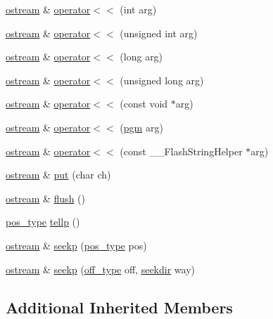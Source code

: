 \begin{DoxyCompactItemize}
\item 
\hyperlink{classostream}{ostream} \& \hyperlink{classostream_a62488f7ce7822c777ea27d15223b8e5f}{operator$<$$<$} (int arg)
\item 
\hyperlink{classostream}{ostream} \& \hyperlink{classostream_ad31df6cd88c7248c01808e40889a7907}{operator$<$$<$} (unsigned int arg)
\item 
\hyperlink{classostream}{ostream} \& \hyperlink{classostream_a15db9977ed82e503bd3cd1f585acf9e6}{operator$<$$<$} (long arg)
\item 
\hyperlink{classostream}{ostream} \& \hyperlink{classostream_aaedd44fefa48cf3f0967fcd699a2909d}{operator$<$$<$} (unsigned long arg)
\item 
\hyperlink{classostream}{ostream} \& \hyperlink{classostream_a2a8febd7c07f078120dd69bb71f25a94}{operator$<$$<$} (const void $\ast$arg)
\item 
\hyperlink{classostream}{ostream} \& \hyperlink{classostream_aac12b0ae1c8fde7a74278536d41d00f0}{operator$<$$<$} (\hyperlink{structpgm}{pgm} arg)
\item 
\hyperlink{classostream}{ostream} \& \hyperlink{classostream_a99ee8d9265d9354f197d02a3d17116be}{operator$<$$<$} (const \+\_\+\+\_\+\+Flash\+String\+Helper $\ast$arg)
\item 
\hyperlink{classostream}{ostream} \& \hyperlink{classostream_a11aad8a1efd284ccfa91cbfb78d089bd}{put} (char ch)
\item 
\hyperlink{classostream}{ostream} \& \hyperlink{classostream_af6be1f30d824f5a65d27d5b5d20b8c6c}{flush} ()
\item 
\hyperlink{classios__base_abe85cf1f181b8bce8022f05ab76aae7f}{pos\+\_\+type} \hyperlink{classostream_a92dec0e2bc8352df1419d1cdc434e619}{tellp} ()
\item 
\hyperlink{classostream}{ostream} \& \hyperlink{classostream_a18b453d2770a8852c312cbda919c4687}{seekp} (\hyperlink{classios__base_abe85cf1f181b8bce8022f05ab76aae7f}{pos\+\_\+type} pos)
\item 
\hyperlink{classostream}{ostream} \& \hyperlink{classostream_af6265a5be29237517b30673667ba4213}{seekp} (\hyperlink{classios__base_a45de7cca0d01da781f4b886179c65c22}{off\+\_\+type} off, \hyperlink{classios__base_ab01103ba35f6ba93a704b3ec0c86191e}{seekdir} way)
\end{DoxyCompactItemize}
\subsection*{Additional Inherited Members}


